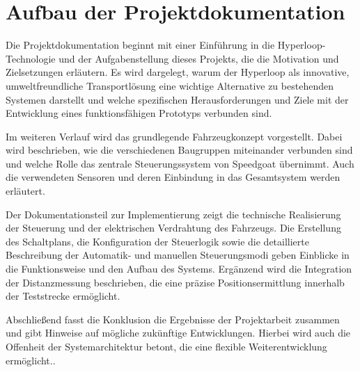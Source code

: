 \section{Aufbau der Projektdokumentation}
\label{section:Aufbau}


Die Projektdokumentation beginnt mit einer Einführung in die Hyperloop-Technologie und der Aufgabenstellung dieses Projekts, die die Motivation und Zielsetzungen erläutern. Es wird dargelegt, warum der Hyperloop als innovative, umweltfreundliche Transportlösung eine wichtige Alternative zu bestehenden Systemen darstellt und welche spezifischen Herausforderungen und Ziele mit der Entwicklung eines funktionsfähigen Prototyps verbunden sind.

Im weiteren Verlauf wird das grundlegende Fahrzeugkonzept vorgestellt. Dabei wird beschrieben, wie die verschiedenen Baugruppen miteinander verbunden sind und welche Rolle das zentrale Steuerungssystem von Speedgoat übernimmt. Auch die verwendeten Sensoren und deren Einbindung in das Gesamtsystem werden erläutert.

Der Dokumentationsteil zur Implementierung zeigt die technische Realisierung der Steuerung und der elektrischen Verdrahtung des Fahrzeugs. Die Erstellung des Schaltplans, die Konfiguration der Steuerlogik sowie die detaillierte Beschreibung der Automatik- und manuellen Steuerungsmodi geben Einblicke in die Funktionsweise und den Aufbau des Systems. Ergänzend wird die Integration der Distanzmessung beschrieben, die eine präzise Positionsermittlung innerhalb der Teststrecke ermöglicht.

Abschließend fasst die Konklusion die Ergebnisse der Projektarbeit zusammen und gibt Hinweise auf mögliche zukünftige Entwicklungen. Hierbei wird auch die Offenheit der Systemarchitektur betont, die eine flexible Weiterentwicklung ermöglicht..


